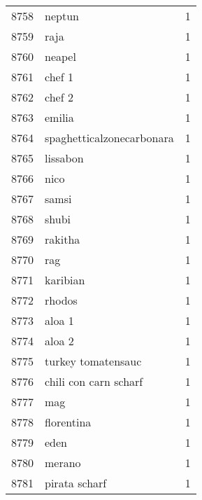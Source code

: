 \begin{tabular}{llr}
8758 &                                             neptun &      1 \\
8759 &                                               raja &      1 \\
8760 &                                             neapel &      1 \\
8761 &                                             chef 1 &      1 \\
8762 &                                             chef 2 &      1 \\
8763 &                                             emilia &      1 \\
8764 &                          spaghetticalzonecarbonara &      1 \\
8765 &                                           lissabon &      1 \\
8766 &                                               nico &      1 \\
8767 &                                              samsi &      1 \\
8768 &                                              shubi &      1 \\
8769 &                                            rakitha &      1 \\
8770 &                                                rag &      1 \\
8771 &                                           karibian &      1 \\
8772 &                                             rhodos &      1 \\
8773 &                                             aloa 1 &      1 \\
8774 &                                             aloa 2 &      1 \\
8775 &                                 turkey tomatensauc &      1 \\
8776 &                              chili con carn scharf &      1 \\
8777 &                                                mag &      1 \\
8778 &                                         florentina &      1 \\
8779 &                                               eden &      1 \\
8780 &                                             merano &      1 \\
8781 &                                      pirata scharf &      1 \\

\end{tabular}
